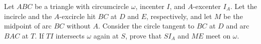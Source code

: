 Let $ABC$ be a triangle with circumcircle $\omega$, incenter $I$, and $A$-excenter $I_A$. Let the incircle and the $A$-excircle hit $BC$ at $D$ and $E$, respectively, and let $M$ be the midpoint of arc $BC$ without $A$. Consider the circle tangent to $BC$ at $D$ and arc $BAC$ at $T$. If $TI$ intersects $\omega$ again at $S$, prove that $SI_A$ and $ME$ meet on $\omega$.